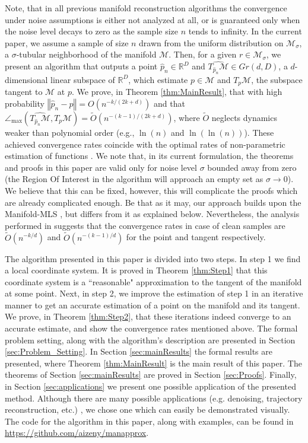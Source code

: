 \documentclass[12pt]{article}
\theoremstyle{remark}
\newcommand{\RR}{\mathbb{R}}
\newcommand{\MM}{\mathcal{M}}
\newcommand{\norm}[1]{\left\Vert #1 \right\Vert}
\newcommand{\wtilde}[1]{\widetilde{#1}}
\newcommand{\maxangle}{\angle_{\max}}
\begin{document}
Note, that in all previous manifold reconstruction algorithms the convergence under noise assumptions is either not analyzed at all, or is guaranteed only when the noise level decays to zero as the sample size $n$ tends to infinity. 
In the current paper, we assume a sample of size $n$ drawn from the uniform distribution on $\MM_\sigma$, a $\sigma$-tubular neighborhood of the manifold $\MM$.
Then, for a given $ r  \in \MM_\sigma $, we present an algorithm that outputs a point $ \hat p_n\in \RR^D$ and $ \widehat{T_{\hat p_n}\MM}\in Gr(d, D) $, a $d$-dimensional linear subspace of $\RR^D$, which estimate $ p\in \MM $ and $ T_{ p}\MM $, the subspace tangent to $\MM$ at $p$.
We prove, in Theorem \ref{thm:MainResult}, that with high probability $ \norm{\hat p_n -  p} = O(n^{-k/(2k+d)}) $ and that $ \maxangle(\widehat{T_{\hat p_n}\MM}, T_{ p}\MM) = \wtilde O(n^{-(k-1)/(2k+d)}) $, where $ \wtilde O $ neglects dynamics weaker than polynomial order (e.g., $ \ln(n) $ and $ \ln(\ln(n)) $).
These achieved convergence rates coincide with the optimal rates of non-parametric estimation of functions \cite{stone1980optimal}.
We note that, in its current formulation, the theorems and proofs in this paper are valid only for noise level $\sigma$  bounded away from zero (the Region Of Interest in the algorithm will approach an empty set as $\sigma \to 0$). 
We believe that this can be fixed, however, this will complicate the proofs which are already complicated enough.
Be that as it may, our approach builds upon the Manifold-MLS \cite{sober2016MMLS}, but differs from it as explained below.
Nevertheless, the analysis performed in \cite{sober2016MMLS} suggests that the convergence rates in case of clean samples are $ \wtilde O(n^{-k/d}) $ and $ \wtilde O(n^{-(k-1)/d}) $ for the point and tangent respectively.

The algorithm presented in this paper is divided into two steps. In step 1 we find a local coordinate system. It is proved in Theorem \ref{thm:Step1} that this coordinate system is a ``reasonable" approximation to the tangent of the manifold at some point. Next, in step 2, we improve the estimation of step 1 in an iterative manner to get an accurate estimation of a point on the manifold and its tangent.  We prove, in Theorem \ref{thm:Step2}, that these iterations indeed converge to an accurate estimate, and show the convergence rates mentioned above. The formal problem setting, along with the algorithm's description are presented in Section \ref{sec:Problem_Setting}. In Section \ref{sec:mainResults} the formal results are presented, where Theorem \ref{thm:MainResult} is the main result of this paper. The theorems of Section \ref{sec:mainResults} are proved in Section \ref{sec:Proofs}. Finally, in Section \ref{sec:applications} we present one possible application of the presented method. Although there are many possible applications (e.g.  denoising, trajectory reconstruction, etc.) , we chose one which can easily be demonstrated visually. The code for the algorithm in this paper, along with examples, can be found in  \textcolor{blue}{\href{https://github.com/aizeny/manapprox}{https://github.com/aizeny/manapprox}}.
\end{document}
